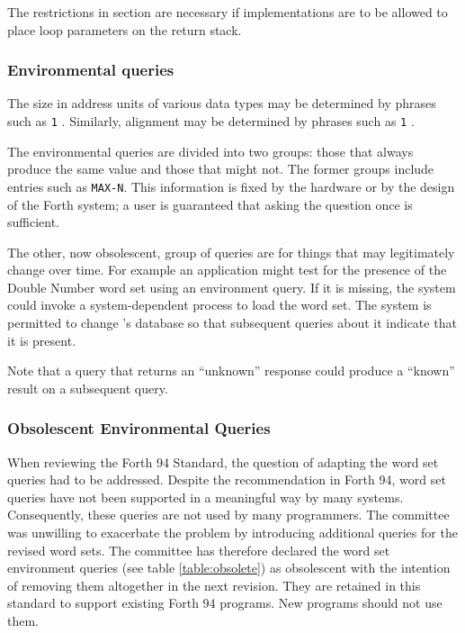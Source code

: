 The restrictions in section 
are necessary if implementations are to be allowed to place loop
parameters on the return stack.

\addtocounter{subsubsection}{2}
\subsubsection{Environmental queries} %

The size in address units of various data types may be determined by
phrases such as \texttt{1} . Similarly, alignment may be
determined by phrases such as \texttt{1} .

The environmental queries are divided into two groups: those that
always produce the same value and those that might not. The former
groups include entries such as \texttt{MAX-N}. This information is
fixed by the hardware or by the design of the Forth system; a user
is guaranteed that asking the question once is sufficient.

The other, now obsolescent, group of queries are for things that may
legitimately change over time. For example an application might test
for the presence of the Double Number word set using an environment
query.  If it is missing, the system could invoke a system-dependent
process to load the word set. The system is permitted to change
's database so that subsequent queries about
it indicate that it is present.

Note that a query that returns an ``unknown'' response could produce
a ``known'' result on a subsequent query.

\subsubsection{Obsolescent Environmental Queries} %
\label{rat:obsolete}

When reviewing the Forth 94 Standard, the question of adapting the
word set queries had to be addressed.  Despite the recommendation
in Forth 94, word set queries have not been
supported in a meaningful way by many systems.  Consequently, these
queries are not used by many programmers.  The committee was unwilling
to exacerbate the problem by introducing additional queries for the
revised word sets.  The committee has therefore declared the word set
environment queries (see table \ref{table:obsolete}) as obsolescent
with the intention of removing them altogether in the next revision.
They are retained in this standard to support existing Forth 94
programs.  New programs should not use them.

